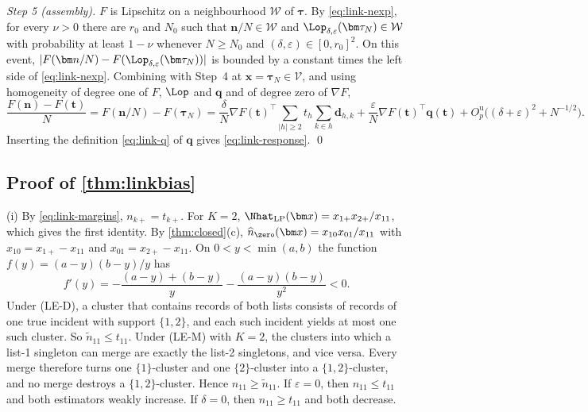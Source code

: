 \emph{Step 5 (assembly).} $F$ is Lipschitz on a neighbourhood $\mathcal W$ of $\bm\tau$. By \eqref{eq:link-nexp}, for every $\nu>0$ there are $r_0$ and $N_0$ such that $\bm n/N\in\mathcal W$ and $\Lop_{\delta,\varepsilon}(\bm\tau_N)\in\mathcal W$ with probability at least $1-\nu$ whenever $N\ge N_0$ and $(\delta,\varepsilon)\in[0,r_0]^2$. On this event, $|F(\bm n/N)-F(\Lop_{\delta,\varepsilon}(\bm\tau_N))|$ is bounded by a constant times the left side of \eqref{eq:link-nexp}. Combining with Step~4 at $\bm x=\bm\tau_N\in\mathcal V$, and using homogeneity of degree one of $F$, $\Lop$ and $\bm q$ and of degree zero of $\nabla F$,
\[
  \frac{F(\bm n)-F(\bm t)}{N}=F(\bm n/N)-F(\bm\tau_N)
  =\frac{\delta}{N}\nabla F(\bm t)^{\top}\sum_{|h|\ge2}t_h\sum_{k\in h}\bm d_{h,k}+\frac{\varepsilon}{N}\nabla F(\bm t)^{\top}\bm q(\bm t)+O_p^{\mathrm u}\bigl((\delta+\varepsilon)^2+N^{-1/2}\bigr).
\]
Inserting the definition \eqref{eq:link-q} of $\bm q$ gives \eqref{eq:link-response}. \qed

\subsection{Proof of \texorpdfstring{\cref{thm:linkbias}}{the linkage-bias theorem}}\label{app:link-bias}

(i) By \eqref{eq:link-margins}, $n_{k+}=t_{k+}$. For $K=2$, $\Nhat_{\mathrm{LP}}(\bm x)=x_{1+}x_{2+}/x_{11}$, which gives the first identity. By \cref{thm:closed}(c), $\widehat n_{\zero}(\bm x)=x_{10}x_{01}/x_{11}$ with $x_{10}=x_{1+}-x_{11}$ and $x_{01}=x_{2+}-x_{11}$. On $0<y<\min(a,b)$ the function $f(y)=(a-y)(b-y)/y$ has
\[
  f'(y)=-\frac{(a-y)+(b-y)}{y}-\frac{(a-y)(b-y)}{y^2}<0 .
\]
Under (LE-D), a cluster that contains records of both lists consists of records of one true incident with support $\{1,2\}$, and each such incident yields at most one such cluster. So $\tilde n_{11}\le t_{11}$. Under (LE-M) with $K=2$, the clusters into which a list-1 singleton can merge are exactly the list-2 singletons, and vice versa. Every merge therefore turns one $\{1\}$-cluster and one $\{2\}$-cluster into a $\{1,2\}$-cluster, and no merge destroys a $\{1,2\}$-cluster. Hence $n_{11}\ge\tilde n_{11}$. If $\varepsilon=0$, then $n_{11}\le t_{11}$ and both estimators weakly increase. If $\delta=0$, then $n_{11}\ge t_{11}$ and both decrease.

